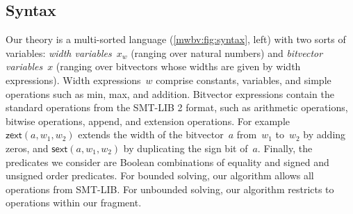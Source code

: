 \subsection{Syntax}
\label{mwbv:sec:syntax}

Our theory is a multi-sorted language (\cref{mwbv:fig:syntax}, left) with two sorts of variables:
\emph{width variables}~$x_w$ (ranging over natural numbers) and
\emph{bitvector variables}~$x$ (ranging over bitvectors whose widths are given by width expressions).
%
Width expressions~$w$ comprise constants, variables, and simple operations
such as min, max, and addition.
%
Bitvector expressions contain the standard operations from the SMT-LIB 2 \cite{barrett2010smt}
format, such as arithmetic operations, bitwise operations, append,
and extension operations. For example $\mathsf{zext}(a, w_1, w_2)$ extends the
width of the bitvector~$a$ from~$w_1$ to~$w_2$ by adding zeros, and
$\mathsf{sext}(a, w_1, w_2)$ by duplicating the sign bit of~$a$.
%
Finally, the predicates we consider are Boolean combinations of equality and
signed and unsigned order predicates.
For bounded solving, our algorithm allows all operations from SMT-LIB. For unbounded solving,
our algorithm restricts to operations within our fragment.

